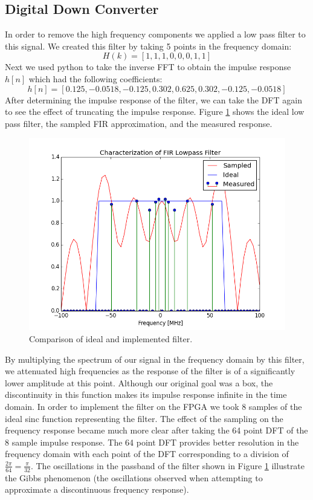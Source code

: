 \documentclass{article}
\begin{document}
  \subsection{Digital Down Converter}
  In order to remove the high frequency components we applied a low pass filter to this signal. We created this filter by taking 5 points in the frequency domain:
  $$H(k) = [1, 1, 1, 0, 0, 0, 1, 1]$$
Next we used python to take the inverse FFT to obtain the impulse response $h[n]$ which had the following coefficients:
$$h[n] = [0.125, -0.0518, -0.125, 0.302, 0.625, 0.302, -0.125, -0.0518]$$
After determining the impulse response of the filter, we can take the DFT again to see the effect of truncating the impulse response. Figure \ref{fig:lpf} shows the ideal low pass filter, the sampled FIR approximation, and the measured response.
\begin{figure}[h!]
\centering
\includegraphics[scale=0.5]{lpf.png}
\caption{Comparison of ideal and implemented filter.}
\label{fig:lpf}
\end{figure}
  By multiplying the spectrum of our signal in the frequency domain by this filter, we attenuated high frequencies as the response of the filter is of a significantly lower amplitude at this point. Although our original goal was a box, the discontinuity in this function makes its impulse response infinite in the time domain. In order to implement the filter on the FPGA we took 8 samples of the ideal sinc function representing the filter.  The effect of the sampling on the frequency response became much more clear after taking the 64 point DFT of the 8 sample impulse response.  The 64 point DFT provides better resolution in the frequency domain with each point of the DFT corresponding to a division of $\frac{2\pi}{64}=\frac{\pi}{32}$.  The oscillations in the passband of the filter shown in Figure \ref{fig:lpf} illustrate the Gibbs phenomenon (the oscillations observed when attempting to approximate a discontinuous frequency response).
\end{document}
